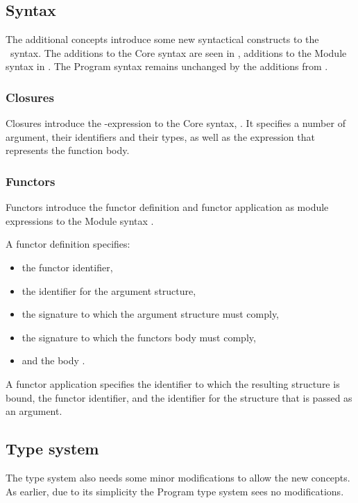 \subsection{Syntax}
The additional concepts introduce some new syntactical constructs to the \MiniML\ syntax.
The additions to the Core syntax are seen in , additions to the Module syntax in .
The Program syntax remains unchanged by the additions from .

\subsubsection{Closures}
Closures introduce the \cmath{\lambda}-expression to the Core syntax, .
It specifies a number of argument, their identifiers and their types, as well as the expression that represents the function body.


\vspace{-1em} %
\subsubsection{Functors}
Functors introduce the functor definition and functor application as module expressions to the Module syntax .

A functor definition specifies:
\begin{itemize}
\item the functor identifier,
\item the identifier  for the argument structure,
\item the signature  to which the argument structure must comply,
\item the signature  to which the functors body must comply,
\item and the body .
\end{itemize}
A functor application specifies the identifier to which the resulting structure is bound, the functor identifier, and the identifier for the structure that is passed as an argument.


\subsection{Type system}
The type system also needs some minor modifications to allow the new concepts.
As earlier, due to its simplicity the Program type system sees no modifications.


